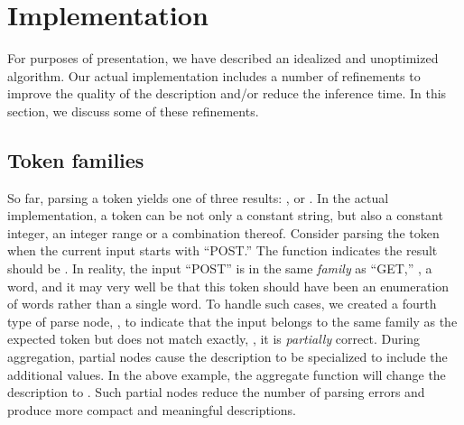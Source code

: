 \section{Implementation}\label{sec:imp}

For purposes of presentation, we have described an idealized and
unoptimized algorithm.  Our actual implementation includes a number of
refinements to improve the quality of the description and/or reduce the
inference time.  In this section, we discuss some of these refinements.

\subsection{Token families}
So far, parsing a  token yields
one of three results: ,  or . 
In the actual implementation, a  token can be not only a constant string, but also
a constant integer, an integer range or a combination thereof.
Consider parsing the token  when
the current input starts with ``POST.'' The
 function indicates the result should be .
In reality, the input ``POST'' is in the same {\em family} as ``GET,'' 
\ie{}, a word,
and it may very well be that this  token should have been 
an enumeration of words rather than a single word.
To handle such cases, we created a fourth type of parse node, , 
to indicate that the input belongs to the same family as the expected
token but does not match exactly, \ie, it is {\em partially} correct.
During aggregation, partial nodes cause the description 
to be specialized to include the additional values.  In the above example, the aggregate 
function will change the description to .
Such partial nodes reduce the number of parsing errors
and produce more compact and meaningful descriptions.


